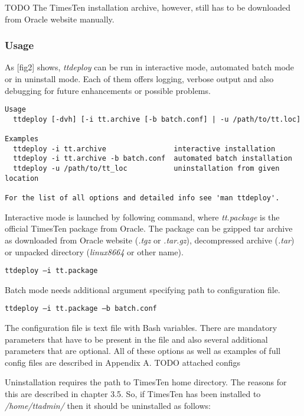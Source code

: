 \documentclass[11pt, letterpaper]{article}
\begin{document}
TODO The TimesTen installation archive, however, still has to be downloaded from Oracle website manually.

\subsubsection{Usage}

As [fig2] shows, \emph{ttdeploy} can be run in interactive mode, automated batch mode or in uninstall mode. Each of them offers logging, verbose output and also debugging for future enhancements or possible problems.

\begin{lstlisting}
Usage
  ttdeploy [-dvh] [-i tt.archive [-b batch.conf] | -u /path/to/tt.loc]

Examples
  ttdeploy -i tt.archive                interactive installation
  ttdeploy -i tt.archive -b batch.conf  automated batch installation
  ttdeploy -u /path/to/tt_loc           uninstallation from given location

For the list of all options and detailed info see 'man ttdeploy'.
\end{lstlisting}

Interactive mode is launched by following command, where \emph{tt.package} is the official TimesTen package from Oracle. The package can be gzipped tar archive as downloaded from Oracle website (\emph{.tgz} or \emph{.tar.gz}), decompressed archive (\emph{.tar}) or unpacked directory (\emph{linux8664} or other name).

\begin{lstlisting}
ttdeploy –i tt.package
\end{lstlisting}

Batch mode needs additional argument specifying path to configuration file.

\begin{lstlisting}
ttdeploy –i tt.package –b batch.conf
\end{lstlisting}

The configuration file is text file with Bash variables. There are mandatory parameters that have to be present in the file and also several additional parameters that are optional. All of these options as well as examples of full config files are described in Appendix A. TODO attached configs

Uninstallation requires the path to TimesTen home directory. The reasons for this are described in chapter 3.5. So, if TimesTen has been installed to \emph{/home/ttadmin/} then it should be uninstalled as follows:
\end{document}
